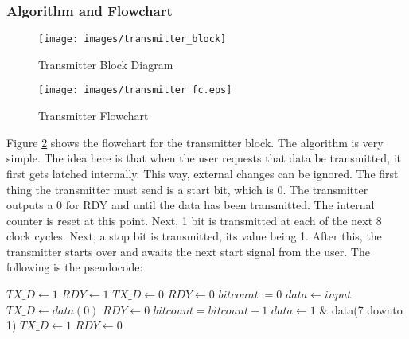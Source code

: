 \documentclass[12pt, a4paper]{article}
\begin{document}
\subsubsection{Algorithm and Flowchart}
\begin{figure}
  \caption{Transmitter Block Diagram}
  \centering
  \texttt{[image: images/transmitter\_block]}
  \label{fig:tran_blk}
\end{figure}
\begin{figure}
  \centering
  \texttt{[image: images/transmitter\_fc.eps]}
  \caption{Transmitter Flowchart}
  \label{fig:tran_fc}
\end{figure}
Figure \ref{fig:tran_fc} shows the flowchart for the transmitter block. The algorithm is very simple. 
The idea here is that when the user requests that data be transmitted,
it first gets latched internally. This way, external changes can be ignored. The first thing the 
transmitter must send is a start bit, which is 0. The transmitter outputs a 0 for RDY and until
the data has been transmitted. The internal counter is reset at this point. Next, 1 bit is transmitted
at each of the next 8 clock cycles. Next, a stop bit is transmitted, its value being 1. After this,
the transmitter starts over and awaits the next start signal from the user. The following is the 
pseudocode:
\begin{algorithmic}
  \LOOP
    \STATE $TX\_D \gets 1$
    \STATE $RDY \gets 1$
        \STATE $TX\_D \gets 0$ 
        \STATE $RDY \gets 0$
        \STATE $bitcount:=0$
        \STATE $data \gets input$ 
                \STATE $TX\_D \gets data(0)$ 
                \STATE $RDY \gets 0$
                \STATE $bitcount = bitcount + 1$
                \STATE $data \gets 1$ \& data(7 downto 1) 
              \ENDIF
        \ENDWHILE
            \STATE $TX\_D \gets 1$ 
            \STATE $RDY \gets 0$
          \ENDIF
      \ENDIF
    \ENDIF
  \ENDLOOP
\end{algorithmic}
\end{document}
